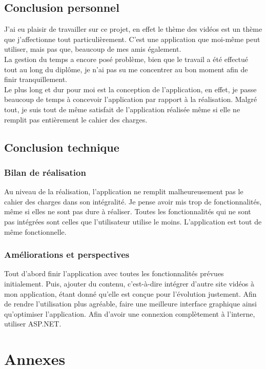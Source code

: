 \documentclass[11pt]{report} %
\begin{document}
\section{Conclusion personnel}
	J'ai eu plaisir de travailler sur ce projet, en effet le thème des vidéos est un thème que j'affectionne tout particulièrement. C'est une application que moi-même peut utiliser, mais pas que, beaucoup de mes amis également.\\
	La gestion du temps a encore posé problème, bien que le travail a été effectué tout au long du diplôme, je n'ai pas su me concentrer au bon moment afin de finir tranquillement.\\ 
	Le plus long et dur pour moi est la conception de l'application, en effet, je passe beaucoup de temps à concevoir l'application par rapport à la réalisation.
	Malgré tout, je suis tout de même satisfait de l'application réalisée même si elle ne remplit pas entièrement le cahier des charges.
	
\section{Conclusion technique}
\subsection{Bilan de réalisation}
	Au niveau de la réalisation, l'application ne remplit malheureusement pas le cahier des charges dans son intégralité. Je pense avoir mis trop de fonctionnalités, même si elles ne sont pas dure à réaliser. Toutes les fonctionnalités qui ne sont pas intégrées sont celles que l'utilisateur utilise le moins.
	L'application est tout de même fonctionnelle.
\subsection{Améliorations et perspectives}
	Tout d'abord finir l'application avec toutes les fonctionnalités prévues initialement.
	Puis, ajouter du contenu, c'est-à-dire intégrer d'autre site vidéos à mon application, étant donné qu'elle est conçue pour l'évolution justement.
	Afin de rendre l'utilisation plus agréable, faire une meilleure interface graphique ainsi qu'optimiser l'application.
	Afin d'avoir une connexion complètement à l'interne, utiliser ASP.NET.

\chapter{Annexes}
\end{document}
